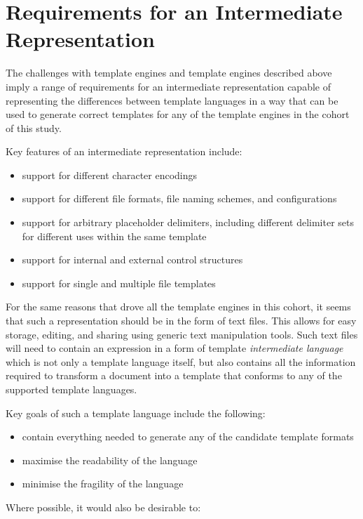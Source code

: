 \section*{Requirements for an Intermediate Representation}

The challenges with template engines and template engines described above imply a range of requirements for an intermediate representation capable of representing the differences between template languages in a way that can be used to generate correct templates for any of the template engines in the cohort of this study.

Key features of an intermediate representation include:

\begin{itemize}
    \item support for different character encodings
    \item support for different file formats, file naming schemes, and configurations
    \item support for arbitrary placeholder delimiters, including different delimiter sets for different uses within the same template
    \item support for internal and external control structures
    \item support for single and multiple file templates
\end{itemize}

For the same reasons that drove all the template engines in this cohort, it seems that such a representation should be in the form of text files. This allows for easy storage, editing, and sharing using generic text manipulation tools. Such text files will need to contain an expression in a form of template \emph{intermediate language} which is not only a template language itself, but also contains all the information required to transform a document into a template that conforms to any of the supported template languages.

Key goals of such a template language include the following:

\begin{itemize}
    \item contain everything needed to generate any of the candidate template formats
    \item maximise the readability of the language
    \item minimise the fragility of the language
\end{itemize}

Where possible, it would also be desirable to:

